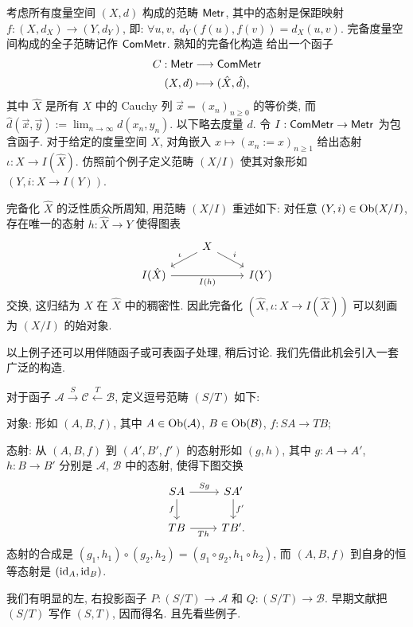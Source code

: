 \begin{example}\label{eg:metric-completion}
	考虑所有度量空间 $(X, d)$ 构成的范畴 $\mathsf{Metr}$, 其中的态射是保距映射 $f: (X, d_X) \to (Y, d_Y)$, 即: $\forall u,v, \; d_Y(f(u), f(v))=d_X(u,v)$. 完备度量空间构成的全子范畴记作 $\mathsf{ComMetr}$. 熟知的完备化构造 \cite[\S 8.1]{Xiong} 给出一个函子
	\begin{align*}
		C: \mathsf{Metr} & \longrightarrow \mathsf{ComMetr} \\
		(X, d) & \longmapsto (\hat{X}, \hat{d}),
	\end{align*}
	其中 $\hat{X}$ 是所有 $X$ 中的 Cauchy 列 $\vec{x} = (x_n)_{n \geq 0}$ 的等价类, 而 $\hat{d}(\vec{x}, \vec{y}) := \displaystyle\lim_{n \to \infty} d(x_n, y_n)$. 以下略去度量 $d$. 令 $I: \mathsf{ComMetr} \to \mathsf{Metr}$ 为包含函子. 对于给定的度量空间 $X$, 对角嵌入 $x \mapsto \left( x_n := x \right)_{n \geq 1}$ 给出态射 $\iota: X \to I(\hat{X})$. 仿照前个例子定义范畴 $(X / I)$ 使其对象形如 $(Y, i: X \to I(Y))$.

	完备化 $\hat{X}$ 的泛性质众所周知, 用范畴 $(X / I)$ 重述如下: 对任意 $(Y, i) \in \operatorname{Ob}(X / I)$, 存在唯一的态射 $h: \hat{X} \to Y$ 使得图表
	\[\begin{tikzcd}[row sep=small]
		{} & X \arrow[ld, "\iota"'] \arrow[rd, "i"] & \\
		I(\hat{X}) \arrow[rr, "I(h)"'] & & I(Y)
	\end{tikzcd}\]
	交换, 这归结为 $X$ 在 $\hat{X}$ 中的稠密性. 因此完备化 $(\hat{X}, \iota: X \to I(\hat{X}))$ 可以刻画为 $(X / I)$ 的始对象.
\end{example}

以上例子还可以用伴随函子或可表函子处理, 稍后讨论. 我们先借此机会引入一套广泛的构造.
\begin{definition}[逗号范畴]\label{def:comma-category}  
	对于函子 $\mathcal{A} \xrightarrow{S} \mathcal{C} \xleftarrow{T} \mathcal{B}$, 定义逗号范畴 $(S / T)$ 如下:
	\begin{compactitem}
		\item 对象: 形如 $(A, B, f)$, 其中 $A \in \operatorname{Ob}(\mathcal{A})$, $B \in \operatorname{Ob}(\mathcal{B})$, $f: SA \to TB$;
		\item 态射: 从 $(A, B, f)$ 到 $(A', B', f')$ 的态射形如 $(g,h)$, 其中 $g: A \to A'$, $h: B \to B'$ 分别是 $\mathcal{A}$, $\mathcal{B}$ 中的态射, 使得下图交换
		\[\begin{tikzcd}
			SA \arrow[r, "Sg"] \arrow[d, "f"'] & SA' \arrow[d, "f'"] \\
			TB \arrow[r, "Th"'] & TB' .
		\end{tikzcd}\]
		态射的合成是 $(g_1, h_1) \circ (g_2, h_2) = (g_1 \circ g_2, h_1 \circ h_2)$, 而 $(A,B,f)$ 到自身的恒等态射是 $(\mathrm{id}_A, \mathrm{id}_B)$.
	\end{compactitem}
\end{definition}
我们有明显的左, 右投影函子 $P: (S / T) \to \mathcal{A}$ 和 $Q: (S / T) \to \mathcal{B}$. 早期文献把 $(S / T)$ 写作 $(S, T)$, 因而得名. 且先看些例子.

